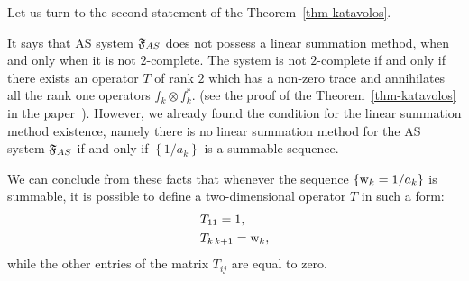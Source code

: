\documentclass[12pt]{article}
\begin{document}
      Let us turn to the second statement of the Theorem~\ref{thm-katavolos}.

      It says that AS system $\mathfrak{F}_{AS}$ does not possess a linear summation method,
        when and only when it is not $2$-complete.
      The system is not $2$-complete if and only if there exists an operator $T$ of rank $2$
        which has a non-zero trace and annihilates all the rank one operators $f_k \otimes f^*_k$.
        (see the proof of the Theorem~\ref{thm-katavolos} in the paper~\cite{katavolos}).
      However, we already found the condition for the linear summation method existence, namely
        there is no linear summation method for the AS system $\mathfrak{F}_{AS}$ if and only if $\left\{1/a_k\right\}$
        is a summable sequence.
      \begin{remark}
        \label{as-rmk}
        We can conclude from these facts that whenever the sequence $\left\{\mathrm{w}_k = 1/a_k\right\}$ is summable,
          it is possible to define a two-dimensional operator $T$ in such a form:
          \begin{align*}
            &T_{11} = 1,\\
            &T_{k\, k+1} = \mathrm{w}_k,
          \end{align*}
        while the other entries of the matrix $T_{ij}$ are equal to zero.
      \end{remark}
      \pagebreak
\end{document}
